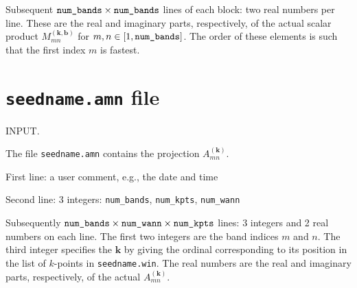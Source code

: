 Subsequent $\verb#num_bands#\times\verb#num_bands#$ lines of each
block: two real numbers per line. These are the real and imaginary
parts, respectively, of the actual scalar product
$M_{mn}^{(\mathbf{k,b})}$ for $m,n \in [1,\verb#num_bands#]$. The
order of these elements is such that the first index $m$ is fastest.


\section{{\tt seedname.amn} file}

INPUT.

The file \verb#seedname.amn# contains the projection
$A_{mn}^{(\mathbf{k})}$.

First line: a user comment, e.g., the date and time


Second line: 3 integers: \verb#num_bands#, \verb#num_kpts#, \verb#num_wann#

                                     
Subsequently
$\verb#num_bands#\times\verb#num_wann#\times\verb#num_kpts#$ 
lines: 3 integers and 2 real numbers on each line. The first 
two integers are the band indices $m$ and $n$. The third integer specifies
the $\mathbf{k}$ by giving the ordinal corresponding to its position
in the list of $k$-points in \verb#seedname.win#. The real numbers
are the real and imaginary parts, respectively, of the actual
$A_{mn}^{(\mathbf{k})}$.



